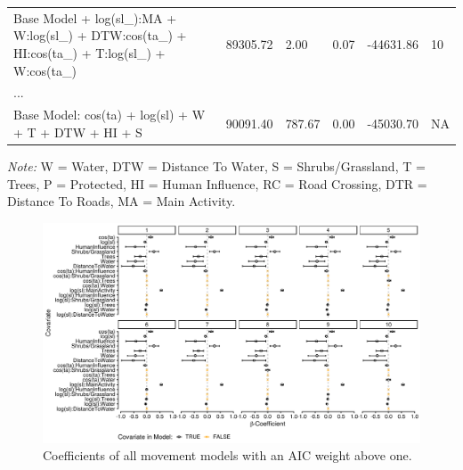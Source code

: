 \documentclass[abstract=off,10pt,a4paper,bibliography=totocnumbered]{article}
\begin{document}
\begin{table}[hbpt]
\begin{center}
{\begin{threeparttable}
\begin{tabular}{llllll}
          Base Model + log(sl\_):MA + W:log(sl\_) + DTW:cos(ta\_) + HI:cos(ta\_) + T:log(sl\_) + W:cos(ta\_) & 89305.72 & 2.00 & 0.07 & -44631.86 & 10\\
          \hdashline
          ...\\
          \hdashline
          Base Model: cos(ta) + log(sl) + W + T + DTW + HI + S & 90091.40 & 787.67 & 0.00 & -45030.70 & NA\\
         \bottomrule
       \end{tabular}
       \begin{tablenotes}
         \item \textit{Note:} W = Water, DTW = Distance To Water, S =
         Shrubs/Grassland, T = Trees, P = Protected, HI = Human Influence, RC =
         Road Crossing, DTR = Distance To Roads, MA = Main Activity.
       \end{tablenotes}
     \end{threeparttable}
    }
  \end{center}
\end{table}












\begin{figure}[htpb]
  \begin{center}
    \includegraphics[width = \textwidth]{99_AllMovementModels}
    \caption{Coefficients of all movement models with an AIC weight above one.}
    \label{AllMovementModels}
  \end{center}
\end{figure}

\newpage
\begingroup
\singlespacing

\endgroup
\end{document}

